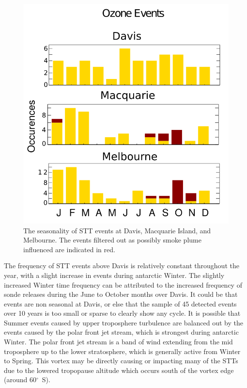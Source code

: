 \documentclass{article}
\begin{document}
  \begin{figure}[!htbp]
    \begin{center}
    \includegraphics[width=1.0\columnwidth]{figures/Seasonality.png}
    \caption{The seasonality of STT events at Davis, Macquarie Island, and Melbourne.
    The events filtered out as possibly smoke plume influenced are indicated in red.}
    \label{fig:SummarySeasonality}
    \end{center}
  \end{figure}
  
  The frequency of STT events above Davis is relatively constant throughout the year, with a slight increase in events during antarctic Winter.
  The slightly increased Winter time frequency can be attributed to the increased frequency of sonde releases during the June to October months over Davis.
  It could be that events are non seasonal at Davis, or else that the sample of 45 detected events over 10 years is too small or sparse to clearly show any cycle.
  It is possible that Summer events caused by upper troposphere turbulence are balanced out by the events caused by the polar front jet stream, which is strongest during antarctic Winter.
  The polar front jet stream is a band of wind extending from the mid troposphere up to the lower stratosphere, which is generally active from Winter to Spring. 
  This vortex may be directly causing or impacting many of the STTs due to the lowered tropopause altitude which occurs south of the vortex edge (around 60$^\circ$~S).
\end{document}
